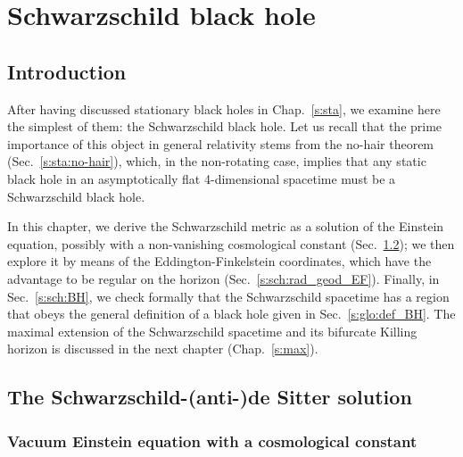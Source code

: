 \chapter{Schwarzschild black hole}
\label{s:sch}

\minitoc

\section{Introduction}

After having discussed stationary black holes in Chap.~\ref{s:sta},
we examine here the simplest of them: the Schwarzschild black hole.
Let us recall that the prime importance of this object
in general relativity stems from the no-hair theorem (Sec.~\ref{s:sta:no-hair}),
which, in the non-rotating case, implies that any static black hole in an asymptotically flat 4-dimensional spacetime must be a Schwarzschild black hole.

In this chapter, we derive the Schwarzschild metric as a solution of the
Einstein equation, possibly with a non-vanishing cosmological constant (Sec.~\ref{s:sch:Sch_sol_lamb}); we then explore it by means of the
Eddington-Finkelstein coordinates, which have
the advantage to be regular on the horizon (Sec.~\ref{s:sch:rad_geod_EF}).
Finally, in Sec.~\ref{s:sch:BH}, we check formally that the Schwarzschild spacetime has a region that obeys the general definition of a black hole given in
Sec.~\ref{s:glo:def_BH}. The maximal extension of the Schwarzschild
spacetime and its bifurcate Killing horizon
is discussed in the next chapter (Chap.~\ref{s:max}).

\section{The Schwarzschild-(anti-)de Sitter solution} \label{s:sch:Sch_sol_lamb}

\subsection{Vacuum Einstein equation with a cosmological constant}

